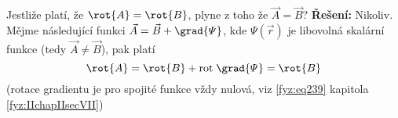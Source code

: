 \begin{mdframed}[style=mdexam]
\begin{example}
  Jestliže platí, že \(\rot{A} = \rot{B}\), plyne z toho že \(\vec{A}=\vec{B}\)?\newline  
  \textbf{Řešení:} 
  Nikoliv. Mějme následující funkci \(\vec{A} = \vec{B} + \grad{\varPsi}\), kde 
  \(\varPsi(\vec{r})\) je libovolná skalární funkce (tedy \(\vec{A}\neq\vec{B}\)), pak platí
  \[\rot{A} = \rot{B} +\mathrm{rot}\;\grad{\varPsi} = \rot{B}\] (rotace gradientu je pro 
  spojité funkce vždy nulová, viz \ref{fyz:eq239} kapitola \ref{fyz:IIchapIIsecVII})
\end{example}
\end{mdframed}